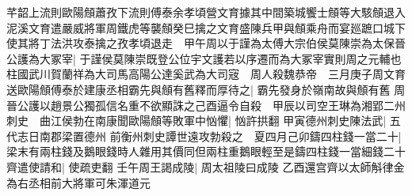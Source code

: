 芊韶上流則歐陽頠蕭孜下流則傅泰余孝頃營文育據其中間築城饗士頠等大駭頠退入泥溪文育遣嚴威將軍周鐵虎等襲頠癸巳擒之文育盛陳兵甲與頠乘舟而宴廵蹠口城下使其將丁法洪攻泰擒之孜孝頃退走　甲午周以于謹為太傅大宗伯侯莫陳崇為太保晉公護為大冢宰|{
	于謹侯莫陳崇既登公位宇文護若以序遷而為大冢宰實則周之元輔也}
柱國武川賀蘭祥為大司馬高陽公達奚武為大司宼　周人殺魏恭帝　三月庚子周文育送歐陽頠傅泰於建康丞相霸先與頠有舊釋而厚待之|{
	霸先發身於嶺南故與頠有舊}
周晉公護以趙景公獨孤信名重不欲顯誅之己酉逼令自殺　甲辰以司空王琳為湘郢二州刺史　曲江侯勃在南康聞歐陽頠等敗軍中忷懼|{
	忷許拱翻}
甲寅德州刺史陳法武|{
	五代志日南郡梁置德州}
前衡州刺史譚世遠攻勃殺之　夏四月己卯鑄四柱錢一當二十|{
	梁末有兩柱錢及鵝眼錢時人雜用其價同但兩柱重鵝眼輕至是鑄四柱錢一當細錢二十}
齊遣使請和|{
	使疏吏翻}
壬午周王謁成陵|{
	周太祖陵曰成陵}
乙酉還宫齊以太師斛律金為右丞相前大將軍可朱渾道元


